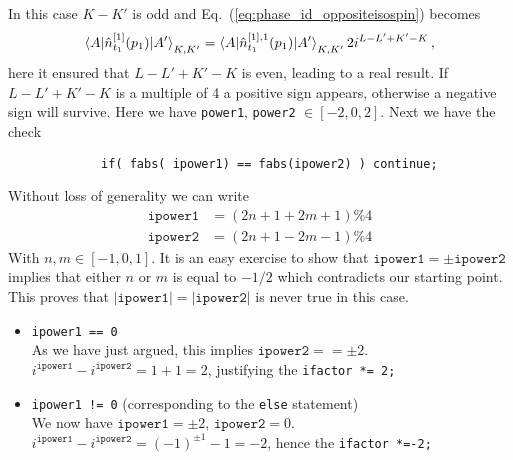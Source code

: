 \documentclass[10pt]{article}
\begin{document}
\begin{itemize}
\begin{itemize}
				In this case $K-K'$ is odd and Eq.~(\ref{eq:phase_id_oppositeisospin}) becomes
				\begin{align}
					\braket{ A | \hat{n}_{t_1}^{[1]}(p_1) | A'}_{K,K'} = \braket{ A | \hat{n}_{t_1}^{[1],1}(p_1) | A'}_{K,K'} 2 i^{L-L'+K'-K} \, ,
				\end{align}
				here it ensured that $L-L'+K'-K$ is even, leading to a real result. If $L-L'+K'-K$ is a multiple of 4 a positive sign appears, otherwise a negative sign will survive.
				Here we have \texttt{power1}, \texttt{power2} $\in [-2,0,2]$.
			Next we have the check
			\begin{verbatim}
			 if( fabs( ipower1) == fabs(ipower2) ) continue;
			 \end{verbatim}
			 Without loss of generality we can write
			 \begin{align*}
			 	\texttt{ipower1} &= (2n+1 + 2m+1) \% 4 \\
			 	\texttt{ipower2} &= (2n+1 - 2m-1) \% 4
			 \end{align*}
			 With $n,m \in [-1,0,1]$. It is an easy exercise to show that $\texttt{ipower1} = \pm \texttt{ipower2}$ implies that either $n$ or $m$ is equal to $-1/2$ which contradicts our starting point. This proves that $ | \texttt{ipower1} | = | \texttt{ipower2} |$ is never true in this case.
			 \begin{itemize}
			 	\item \texttt{ipower1 == 0} \\
			 		As we have just argued, this implies $\texttt{ipower2} == \pm 2$. $i^{\texttt{ipower1}} - i^{\texttt{ipower2}} = 1 + 1 = 2$, justifying the \texttt{ifactor *= 2;}
			 	\item \texttt{ipower1 != 0} (corresponding to the \texttt{else} statement) \\
			 		We now have $\texttt{ipower1} = \pm 2$, $\texttt{ipower2} = 0$. $i^{\texttt{ipower1}} - i^{\texttt{ipower2}} = (-1)^{\pm 1} -1 = -2$, hence the \texttt{ifactor *=-2;}
			 \end{itemize}
		\end{itemize}
\end{itemize}
\end{document}
